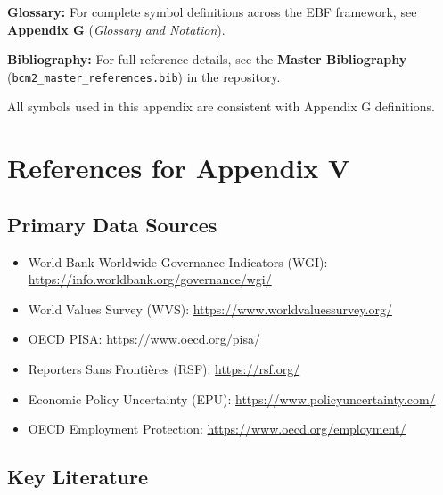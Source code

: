 \begin{tcolorbox}[colback=blue!5!white, colframe=blue!75!black, 
    title=\textbf{Central References}]

\textbf{Glossary:} For complete symbol definitions across the EBF framework, 
see \textbf{Appendix G} (\textit{Glossary and Notation}).

\textbf{Bibliography:} For full reference details, see the 
\textbf{Master Bibliography} (\texttt{bcm2\_master\_references.bib}) 
in the repository.

All symbols used in this appendix are consistent with Appendix G definitions.

\end{tcolorbox}

\section{References for Appendix V}
\label{sec:V-references}

\subsection{Primary Data Sources}

\begin{itemize}[nosep]
    \item World Bank Worldwide Governance Indicators (WGI): \url{https://info.worldbank.org/governance/wgi/}
    \item World Values Survey (WVS): \url{https://www.worldvaluessurvey.org/}
    \item OECD PISA: \url{https://www.oecd.org/pisa/}
    \item Reporters Sans Frontières (RSF): \url{https://rsf.org/}
    \item Economic Policy Uncertainty (EPU): \url{https://www.policyuncertainty.com/}
    \item OECD Employment Protection: \url{https://www.oecd.org/employment/}
\end{itemize}

\subsection{Key Literature}


